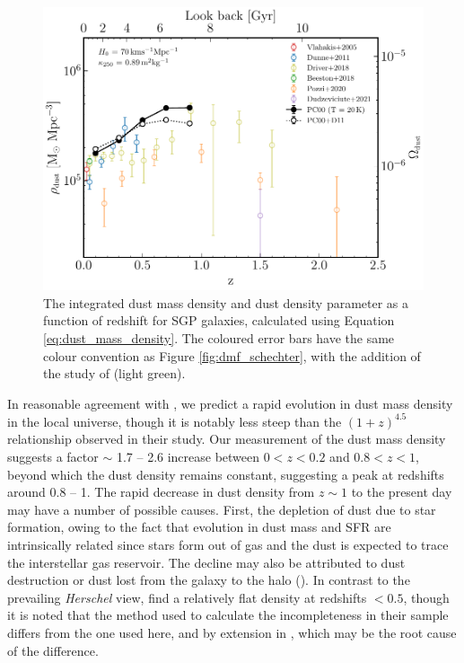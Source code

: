 \begin{figure}
	\centering
	\includegraphics[width=0.75\columnwidth]{Figures/dmd.pdf}
	\caption[Integrated dust mass density as a function of redshift]{The integrated dust mass density and dust density parameter as a function of redshift for SGP galaxies, calculated using Equation \ref{eq:dust_mass_density}. The coloured error bars have the same colour convention as Figure \ref{fig:dmf_schechter}, with the addition of the study of \citealt{Driver_2018} (light green).}
	\label{fig:dmd}
\end{figure}

In reasonable agreement with \citealt{Dunne_2011}, we predict a rapid evolution in dust mass density in the local universe, though it is notably less steep than the $(1+z)^{4.5}$ relationship observed in their study. Our measurement of the dust mass density suggests a factor $\sim$ 1.7 -- 2.6 increase between $0 < z < 0.2$ and $0.8 < z < 1$, beyond which the dust density remains constant, suggesting a peak at redshifts around 0.8 -- 1. The rapid decrease in dust density from $z \sim 1$ to the present day may have a number of possible causes. First, the depletion of dust due to star formation, owing to the fact that evolution in dust mass and SFR are intrinsically related since stars form out of gas and the dust is expected to trace the interstellar gas reservoir. The decline may also be attributed to dust destruction or dust lost from the galaxy to the halo (\citealt{Dunne_2011}). In contrast to the prevailing \textit{Herschel} view, \citealt{Driver_2018} find a relatively flat density at redshifts $< 0.5$, though it is noted that the method used to calculate the incompleteness in their sample differs from the one used here, and by extension in \citealt{Dunne_2011}, which may be the root cause of the difference.

